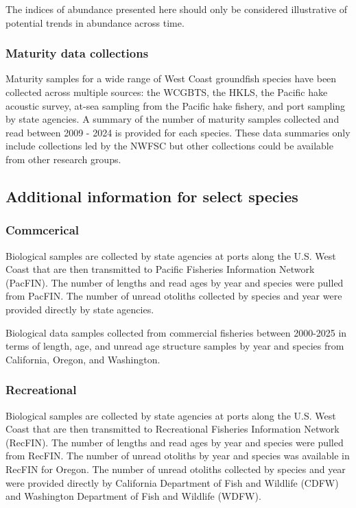 \documentclass[
  english,
]{article}
\begin{document}
The indices of abundance presented here should only be considered
illustrative of potential trends in abundance across time.

\subsubsection{Maturity data
collections}\label{maturity-data-collections}

Maturity samples for a wide range of West Coast groundfish species have
been collected across multiple sources: the WCGBTS, the HKLS, the
Pacific hake acoustic survey, at-sea sampling from the Pacific hake
fishery, and port sampling by state agencies. A summary of the number of
maturity samples collected and read between 2009 - 2024 is provided for
each species. These data summaries only include collections led by the
NWFSC but other collections could be available from other research
groups.

\subsection{Additional information for select
species}\label{additional-information-for-select-species}

\subsubsection{Commcerical}\label{commcerical}

Biological samples are collected by state agencies at ports along the
U.S. West Coast that are then transmitted to Pacific Fisheries
Information Network (PacFIN). The number of lengths and read ages by
year and species were pulled from PacFIN. The number of unread otoliths
collected by species and year were provided directly by state agencies.

Biological data samples collected from commercial fisheries between
2000-2025 in terms of length, age, and unread age structure samples by
year and species from California, Oregon, and Washington.

\subsubsection{Recreational}\label{recreational}

Biological samples are collected by state agencies at ports along the
U.S. West Coast that are then transmitted to Recreational Fisheries
Information Network (RecFIN). The number of lengths and read ages by
year and species were pulled from RecFIN. The number of unread otoliths
by year and species was available in RecFIN for Oregon. The number of
unread otoliths collected by species and year were provided directly by
California Department of Fish and Wildlife (CDFW) and Washington
Department of Fish and Wildlife (WDFW).
\end{document}
